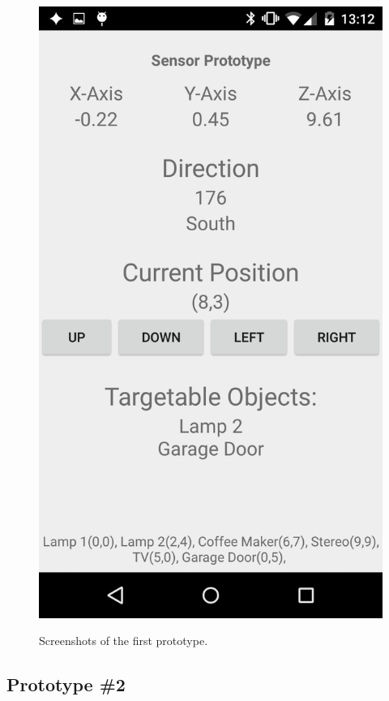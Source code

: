 \begin{figure}
{        \includegraphics[scale=0.1]{images/Prototype1_Android_2.png}
    }
    \caption{Screenshots of the first prototype.}
    \label{fig:prototype1-app-screenshots}
\end{figure}


\subsection{Prototype \#2}
\label{sec:implementation:prototypes:prototype2}

